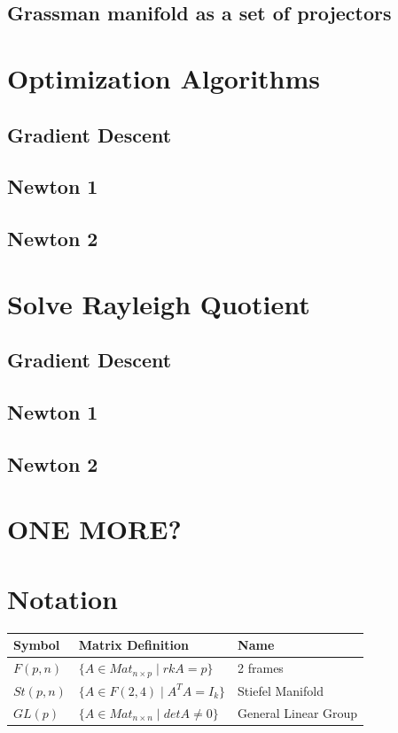 \documentclass[11pt,a4paper]{report}
\begin{document}
\section{Grassman manifold as a set of projectors }

\chapter{Optimization Algorithms}
\section{Gradient Descent}
\section{Newton 1}
\section{Newton 2}

\chapter{Solve Rayleigh Quotient}
\section{Gradient Descent}
\section{Newton 1}
\section{Newton 2}
 
\chapter{ONE MORE?} 

\chapter{Notation} 
 
\noindent\begin{tabularx}{\textwidth}{@{}XXX@{}}  \toprule
  Symbol & Matrix Definition & Name \\
  \toprule
  $F(p,n)$  & $\{A \in Mat_{n \times p}  \; | \; rkA = p  \} $ & 2 frames \\
  \toprule
  $St(p,n)$ & $ \{ A \in F(2,4) \; | \; A^T A = I_k \} $ & Stiefel Manifold \\
  \toprule
  $ GL(p)$ &  $ \{ A \in Mat_{n \times n} \; | \; det A \neq 0 \}$ & General Linear Group \\
\end{tabularx}\offinterlineskip

 


 
 
\end{document}
